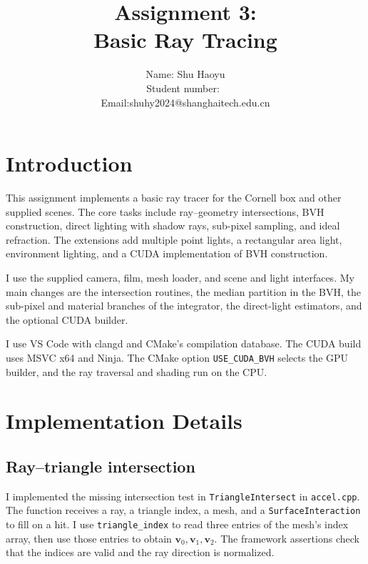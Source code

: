 \documentclass[acmtog]{acmart}
\title{Assignment 3:\\ {Basic Ray Tracing}}
\author{Name: \quad Shu Haoyu \\ Student number:\quad 2024533012\ 
\\Email:\quad shuhy2024@shanghaitech.edu.cn \quad \texttt{}}
\begin{document}
\maketitle

\vspace*{2 ex}

\section{Introduction}
This assignment implements a basic ray tracer for the Cornell box and other supplied scenes. The core tasks include ray--geometry intersections, BVH construction, direct lighting with shadow rays, sub-pixel sampling, and ideal refraction. The extensions add multiple point lights, a rectangular area light, environment lighting, and a CUDA implementation of BVH construction.

I use the supplied camera, film, mesh loader, and scene and light interfaces. My main changes are the intersection routines, the median partition in the BVH, the sub-pixel and material branches of the integrator, the direct-light estimators, and the optional CUDA builder.

I use VS Code with clangd and CMake's compilation database. The CUDA build uses MSVC x64 and Ninja. The CMake option \texttt{USE\_CUDA\_BVH} selects the GPU builder, and the ray traversal and shading run on the CPU.

\section{Implementation Details}

\subsection{Ray--triangle intersection}
I implemented the missing intersection test in \texttt{TriangleIntersect} in \texttt{accel.cpp}. The function receives a ray, a triangle index, a mesh, and a \texttt{SurfaceInteraction} to fill on a hit. I use \texttt{triangle\_index} to read three entries of the mesh's index array, then use those entries to obtain $\mathbf v_0,\mathbf v_1,\mathbf v_2$. The framework assertions check that the indices are valid and the ray direction is normalized.
\end{document}
